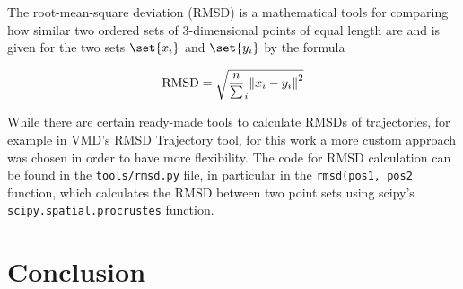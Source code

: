 \documentclass[a4paper,11pt,oneside,final,english,toc=bib,draft]{scrbook}
\begin{document}
The root-mean-square deviation (RMSD) is a mathematical tools for comparing how similar two ordered sets of 3-dimensional points of equal length are and is given for the two sets \( \set{x_i} \) and \( \set{y_i} \) by the formula

\[
  \text{RMSD} = \sqrt{ \frac{n} \sum_i \norm{x_i - y_i}^2 }
\]

While there are certain ready-made tools to calculate RMSDs of trajectories, for example in VMD's\cite{humphrey_vmd_1996} RMSD Trajectory tool, for this work a more custom approach was chosen in order to have more flexibility. The code for RMSD calculation can be found in the \verb|tools/rmsd.py| file, in particular in the \verb|rmsd(pos1, pos2| function, which calculates the RMSD between two point sets using scipy's\cite{virtanen_scipy_2020} \verb|scipy.spatial.procrustes| function.

























\chapter{Conclusion} %
\label{cha:conclusion}
\end{document}
